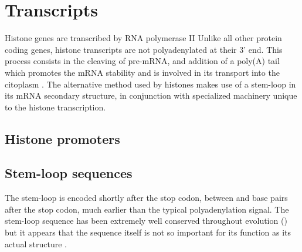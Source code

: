 \section{Transcripts}
  
  Histone genes are transcribed by RNA polymerase II 
  Unlike all other protein coding genes, histone transcripts are not polyadenylated at
  their 3' end. This process consists in the cleaving of pre-mRNA, and addition of a
  poly(A) tail which promotes the mRNA stability and is involved in its transport
  into the citoplasm \citep{mRNA-end-processing}. The alternative method used by
  histones makes use of a stem-loop in its mRNA secondary structure, in conjunction
  with specialized machinery unique to the histone transcription.

  \subsection{Histone promoters}

  
  \subsection{Stem-loop sequences}
    The stem-loop is encoded shortly after the stop codon, between \StemLoopStart{} and
    \StemLoopEnd{} base pairs after the stop codon, much earlier than the typical
    polyadenylation signal. The stem-loop sequence has been extremely well conserved
    throughout evolution () but it appears that the
    sequence itself is not so important for its function as its actual structure
    \citep{stem-loop-structure}.

